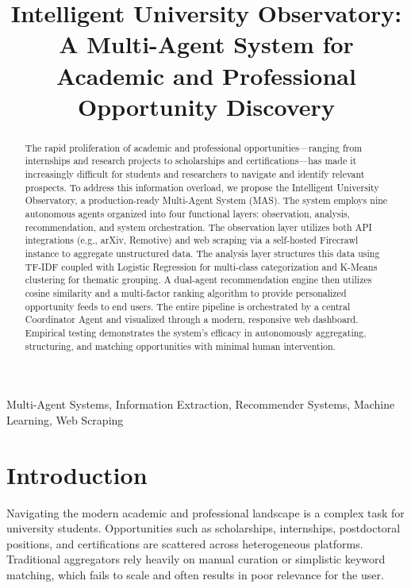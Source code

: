 \documentclass[conference]{IEEEtran}
\begin{document}
\title{Intelligent University Observatory: A Multi-Agent System for Academic and Professional Opportunity Discovery}

\author{
}

\maketitle

\begin{abstract}
The rapid proliferation of academic and professional opportunities—ranging from internships and research projects to scholarships and certifications—has made it increasingly difficult for students and researchers to navigate and identify relevant prospects. To address this information overload, we propose the Intelligent University Observatory, a production-ready Multi-Agent System (MAS). The system employs nine autonomous agents organized into four functional layers: observation, analysis, recommendation, and system orchestration. The observation layer utilizes both API integrations (e.g., arXiv, Remotive) and web scraping via a self-hosted Firecrawl instance to aggregate unstructured data. The analysis layer structures this data using TF-IDF coupled with Logistic Regression for multi-class categorization and K-Means clustering for thematic grouping. A dual-agent recommendation engine then utilizes cosine similarity and a multi-factor ranking algorithm to provide personalized opportunity feeds to end users. The entire pipeline is orchestrated by a central Coordinator Agent and visualized through a modern, responsive web dashboard. Empirical testing demonstrates the system's efficacy in autonomously aggregating, structuring, and matching opportunities with minimal human intervention.
\end{abstract}

\begin{IEEEkeywords}
Multi-Agent Systems, Information Extraction, Recommender Systems, Machine Learning, Web Scraping
\end{IEEEkeywords}

\section{Introduction}
Navigating the modern academic and professional landscape is a complex task for university students. Opportunities such as scholarships, internships, postdoctoral positions, and certifications are scattered across heterogeneous platforms. Traditional aggregators rely heavily on manual curation or simplistic keyword matching, which fails to scale and often results in poor relevance for the user. 
\end{document}
